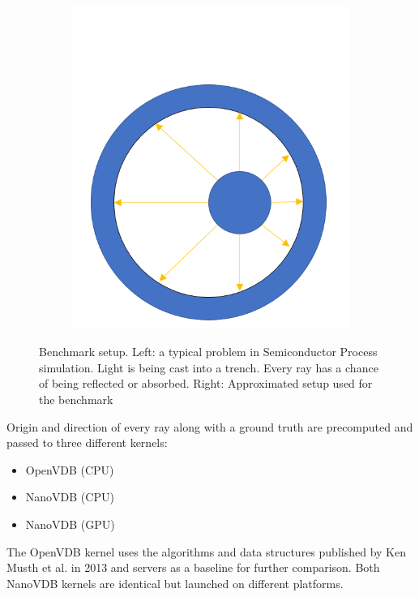 \begin{figure}[H]
\begin{subfigure}{0.35\textwidth}
\end{subfigure}
	\begin{subfigure}{0.35\textwidth}
	\includegraphics[width=1\linewidth]{res/benchmark_setup.png}
	\caption{}
\end{subfigure}

\caption{Benchmark setup. Left: a typical problem in Semiconductor Process simulation. Light is being cast into a trench. Every ray has a chance of being reflected or absorbed.
Right: Approximated setup used for the benchmark} 
\label{fig:benchmark_setup}
\end{figure}


Origin and direction of every ray along with a ground truth are precomputed and passed to three different kernels:

\begin{itemize}
	\item OpenVDB (CPU)
	\item NanoVDB (CPU)
	\item NanoVDB (GPU)
\end{itemize}

The OpenVDB kernel uses the algorithms and data structures published by Ken Musth et al. in 2013 and servers as a baseline for further comparison.
Both NanoVDB kernels are identical but launched on different platforms.

